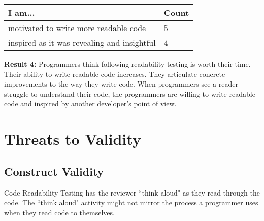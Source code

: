 \documentclass[conference]{IEEEtran}
\begin{document}
\begin{table}[!t]
\renewcommand{\arraystretch}{1.3}
\centering
\begin{tabular}{l||l}
\hline
\bfseries I am... & \bfseries Count\\
\hline\hline
motivated to write more readable code    & 5 \\
inspired as it was revealing and insightful & 4  
\end{tabular}
\end{table}

\textbf{Result 4:} Programmers think following readability testing is worth their time. Their ability to write readable code increases. They articulate concrete improvements to the way they write code. When programmers see a reader struggle to understand their code, the programmers are willing to write readable code and inspired by another developer’s point of view.

\section{Threats to Validity}
\subsection{Construct Validity}
Code Readability Testing has the reviewer ``think aloud" as they read through the code. The ``think aloud" activity might not mirror the process a programmer uses when they read code to themselves.
\end{document}

